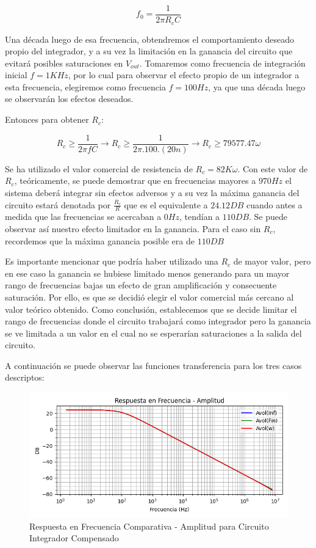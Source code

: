 $$f_0 = \frac{1}{2\pi R_cC}$$

Una década luego de esa frecuencia, obtendremos el comportamiento deseado propio del integrador, y a su vez la limitación en la ganancia del circuito que evitará posibles saturaciones en $V_{out}$.
Tomaremos como frecuencia de integración inicial $f=1KHz$, por lo cual para observar el efecto propio de un integrador a esta frecuencia, elegiremos como frecuencia
$f=100Hz$, ya que una década luego se observarán los efectos deseados. 

Entonces para obtener $R_c$:

$$R_c \geq \frac {1}{2\pi fC} \longrightarrow R_c \geq \frac {1}{2\pi .100.(20n)}\longrightarrow R_c \geq 79577.47 \omega $$

Se ha utilizado el valor comercial de resistencia de $R_c=82K\omega$. Con este valor de $R_c$, teóricamente, se puede demostrar que en frecuencias mayores
a $970 Hz$ el sistema deberá integrar sin efectos adversos y a su vez la máxima ganancia del circuito estará denotada por $\frac {R_c}{R}$ que es el equivalente a
$24.12DB$ cuando antes a medida que las frecuencias se acercaban a $0Hz$, tendían a $110DB$. Se puede observar así nuestro efecto limitador en la ganancia.
Para el caso sin $R_c$, recordemos que la máxima ganancia posible era de $110DB$

Es importante mencionar que podría haber utilizado una $R_c$ de mayor valor, pero en ese caso la ganancia se hubiese limitado menos generando para un mayor rango de frecuencias bajas
un efecto de gran amplificación y consecuente saturación. Por ello, es que se decidió elegir el valor comercial más cercano al valor teórico obtenido.
Como conclusión, establecemos que se decide limitar el rango de frecuencias donde el circuito trabajará como integrador pero la ganancia se ve limitada a un valor
en el cual no se esperarían saturaciones a la salida del circuito.

A continuación se puede observar las funciones transferencia para los tres casos descriptos:

\begin{figure}[H]
    \centering 
    \includegraphics [scale=1] {../Ejercicio3-CircuitoIntegradoresyDerivadores/Imagenes/diagrama-bode-integrador-compensado-amplitud.png} 
    \caption{Respuesta en Frecuencia Comparativa - Amplitud para Circuito Integrador Compensado}
    \label{fig:emptyPlotTool}
\end{figure}

